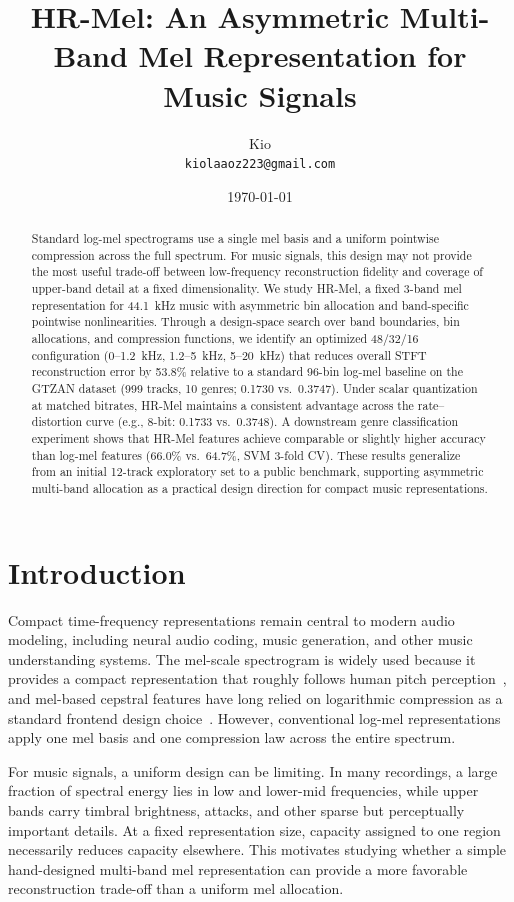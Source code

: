 \documentclass[twocolumn]{article}
\title{HR-Mel: An Asymmetric Multi-Band Mel Representation for Music Signals}
\author{
  Kio\\
  \texttt{kiolaaoz223@gmail.com}
}
\date{\today}
\begin{document}
\maketitle

\begin{abstract}
Standard log-mel spectrograms use a single mel basis and a uniform pointwise compression across the full spectrum. For music signals, this design may not provide the most useful trade-off between low-frequency reconstruction fidelity and coverage of upper-band detail at a fixed dimensionality. We study HR-Mel, a fixed 3-band mel representation for 44.1~kHz music with asymmetric bin allocation and band-specific pointwise nonlinearities. Through a design-space search over band boundaries, bin allocations, and compression functions, we identify an optimized 48/32/16 configuration (0--1.2~kHz, 1.2--5~kHz, 5--20~kHz) that reduces overall STFT reconstruction error by 53.8\% relative to a standard 96-bin log-mel baseline on the GTZAN dataset (999 tracks, 10 genres; 0.1730 vs.\ 0.3747). Under scalar quantization at matched bitrates, HR-Mel maintains a consistent advantage across the rate--distortion curve (e.g., 8-bit: 0.1733 vs.\ 0.3748). A downstream genre classification experiment shows that HR-Mel features achieve comparable or slightly higher accuracy than log-mel features (66.0\% vs.\ 64.7\%, SVM 3-fold CV). These results generalize from an initial 12-track exploratory set to a public benchmark, supporting asymmetric multi-band allocation as a practical design direction for compact music representations.
\end{abstract}

\section{Introduction}

Compact time-frequency representations remain central to modern audio modeling, including neural audio coding, music generation, and other music understanding systems. The mel-scale spectrogram is widely used because it provides a compact representation that roughly follows human pitch perception~\cite{stevens1937scale}, and mel-based cepstral features have long relied on logarithmic compression as a standard frontend design choice~\cite{davis1980comparison}. However, conventional log-mel representations apply one mel basis and one compression law across the entire spectrum.

For music signals, a uniform design can be limiting. In many recordings, a large fraction of spectral energy lies in low and lower-mid frequencies, while upper bands carry timbral brightness, attacks, and other sparse but perceptually important details. At a fixed representation size, capacity assigned to one region necessarily reduces capacity elsewhere. This motivates studying whether a simple hand-designed multi-band mel representation can provide a more favorable reconstruction trade-off than a uniform mel allocation.
\end{document}
